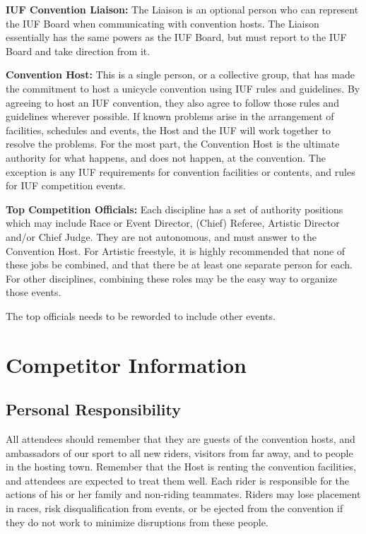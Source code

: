 \textbf{IUF Convention Liaison:} The Liaison is an optional person who can represent the IUF Board when communicating with convention hosts.
The Liaison essentially has the same powers as the IUF Board, but must report to the IUF Board and take direction from it.

\textbf{Convention Host:} This is a single person, or a collective group, that has made the commitment to host a unicycle convention using IUF rules and guidelines.
By agreeing to host an IUF convention, they also agree to follow those rules and guidelines wherever possible.
If known problems arise in the arrangement of facilities, schedules and events, the Host and the IUF will work together to resolve the problems.
For the most part, the Convention Host is the ultimate authority for what happens, and does not happen, at the convention.
The exception is any IUF requirements for convention facilities or contents, and rules for IUF competition events.

\textbf{Top Competition Officials:} Each discipline has a set of authority positions which may include Race or Event Director, (Chief) Referee, Artistic Director and/or Chief Judge.
They are not autonomous, and must answer to the Convention Host.
For Artistic freestyle, it is highly recommended that none of these jobs be combined, and that there be at least one separate person for each.
For other disciplines, combining these roles may be the easy way to organize those events.

\begin{comment2016}
The top officials needs to be reworded to include other events.
\end{comment2016}

\chapter{Competitor Information}

\section{Personal Responsibility}
All attendees should remember that they are guests of the convention hosts, and ambassadors of our sport to all new riders, visitors from far away, and to people in the hosting town.
Remember that the Host is renting the convention facilities, and attendees are expected to treat them well.
Each rider is responsible for the actions of his or her family and non-riding teammates.
Riders may lose placement in races, risk disqualification from events, or be ejected from the convention if they do not work to minimize disruptions from these people.

